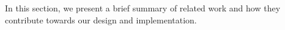In this section, we present a brief summary of related work and how they contribute towards
our design and implementation.
